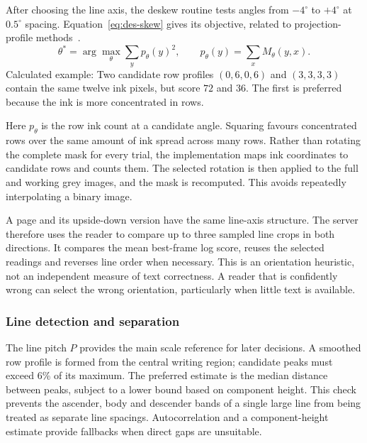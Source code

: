 After choosing the line axis, the deskew routine tests angles from $-4^\circ$ to $+4^\circ$ at $0.5^\circ$ spacing. Equation~\ref{eq:des-skew} gives its objective, related to projection-profile methods~\cite[page to verify]{postl1986}.
\begin{equation}
\theta^*=\arg\max_\theta\sum_y p_\theta(y)^2,\qquad
p_\theta(y)=\sum_x M_\theta(y,x).
\label{eq:des-skew}
\end{equation}
Calculated example: Two candidate row profiles $(0,6,0,6)$ and $(3,3,3,3)$ contain the same twelve ink pixels, but score $72$ and $36$. The first is preferred because the ink is more concentrated in rows. \cite[segment.py, Deskew]{braunepipeline2026}

Here $p_\theta$ is the row ink count at a candidate angle. Squaring favours concentrated rows over the same amount of ink spread across many rows. Rather than rotating the complete mask for every trial, the implementation maps ink coordinates to candidate rows and counts them. The selected rotation is then applied to the full and working grey images, and the mask is recomputed. This avoids repeatedly interpolating a binary image.~\cite[segment.py]{braunepipeline2026}

A page and its upside-down version have the same line-axis structure. The server therefore uses the reader to compare up to three sampled line crops in both directions. It compares the mean best-frame log score, reuses the selected readings and reverses line order when necessary. This is an orientation heuristic, not an independent measure of text correctness. A reader that is confidently wrong can select the wrong orientation, particularly when little text is available.~\cite[segment.py]{braunepipeline2026}

\subsubsection{Line detection and separation}
The line pitch $P$ provides the main scale reference for later decisions. A smoothed row profile is formed from the central writing region; candidate peaks must exceed 6\% of its maximum. The preferred estimate is the median distance between peaks, subject to a lower bound based on component height. This check prevents the ascender, body and descender bands of a single large line from being treated as separate line spacings. Autocorrelation and a component-height estimate provide fallbacks when direct gaps are unsuitable.~\cite[segment.py]{braunepipeline2026}


